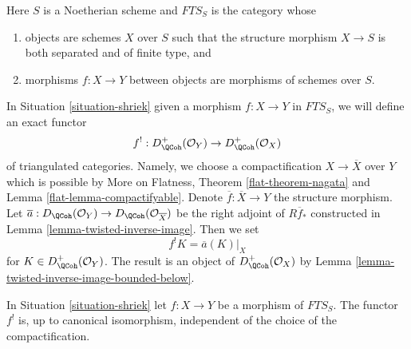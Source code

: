 \begin{situation}
\label{situation-shriek}
Here $S$ is a Noetherian scheme and $\textit{FTS}_S$ is the category whose
\begin{enumerate}
\item objects are schemes $X$ over $S$ such that the structure
morphism $X \to S$ is both separated and of finite type, and
\item morphisms $f : X \to Y$ between objects are morphisms
of schemes over $S$.
\end{enumerate}
\end{situation}

\noindent
In Situation \ref{situation-shriek} given a morphism $f : X \to Y$
in $\textit{FTS}_S$, we will define an exact functor
$$
f^! : D_\QCoh^+(\mathcal{O}_Y) \to D_\QCoh^+(\mathcal{O}_X)
$$
of triangulated categories. Namely, we choose a compactification
$X \to \overline{X}$ over $Y$ which is possible by
More on Flatness, Theorem \ref{flat-theorem-nagata} and
Lemma \ref{flat-lemma-compactifyable}.
Denote $\overline{f} : \overline{X} \to Y$
the structure morphism. Let
$\overline{a} : D_\QCoh(\mathcal{O}_Y) \to D_\QCoh(\mathcal{O}_{\overline{X}})$
be the right adjoint of $R\overline{f}_*$
constructed in Lemma \ref{lemma-twisted-inverse-image}. Then we set
$$
f^!K  = \overline{a}(K)|_X
$$
for $K \in D_\QCoh^+(\mathcal{O}_Y)$. The result is an object of
$D_\QCoh^+(\mathcal{O}_X)$ by
Lemma \ref{lemma-twisted-inverse-image-bounded-below}.

\begin{lemma}
\label{lemma-shriek-well-defined}
In Situation \ref{situation-shriek} let $f : X \to Y$ be a morphism
of $\textit{FTS}_S$. The functor $f^!$ is, up to canonical isomorphism,
independent of the choice of the compactification.
\end{lemma}

